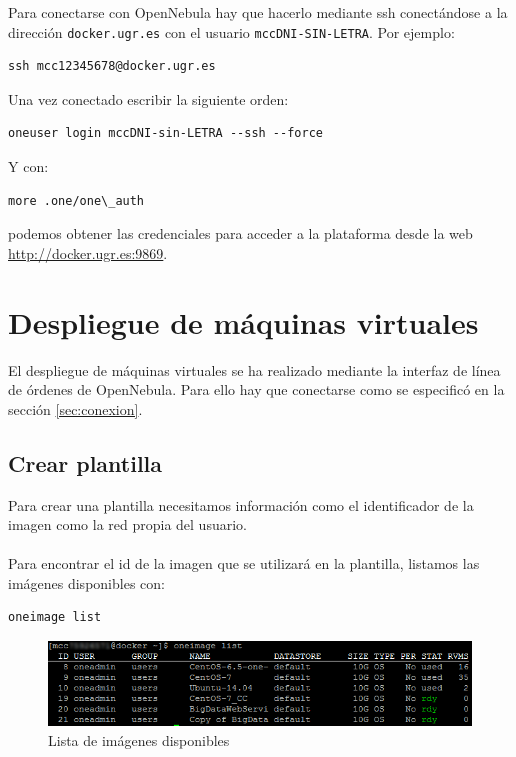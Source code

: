 Para conectarse con OpenNebula hay que hacerlo mediante ssh conectándose a la dirección \texttt{docker.ugr.es} con el usuario \texttt{mccDNI-SIN-LETRA}. Por ejemplo:

\begin{lstlisting}
ssh mcc12345678@docker.ugr.es
\end{lstlisting}

Una vez conectado escribir la siguiente orden: 

\begin{lstlisting}
oneuser login mccDNI-sin-LETRA --ssh --force
\end{lstlisting}

Y con: 

\begin{lstlisting}
more .one/one\_auth
\end{lstlisting}

podemos obtener las credenciales para acceder a la plataforma desde la web \url{http://docker.ugr.es:9869}.

\section{Despliegue de máquinas virtuales}

El despliegue de máquinas virtuales se ha realizado mediante la interfaz de línea de órdenes de OpenNebula. Para ello hay que conectarse como se especificó en la sección \ref{sec:conexion}.

\label{sec:crear-plantilla}
\subsection{Crear plantilla}

Para crear una plantilla necesitamos información como el identificador de la imagen como la red propia del usuario.
\\ \\
Para encontrar el id de la imagen que se utilizará en la plantilla, listamos las imágenes disponibles con:

\begin{lstlisting}
oneimage list
\end{lstlisting}

\begin{figure}[H]
	\centering
	\includegraphics[width=14cm]{img/oneimage-list}
	\caption{Lista de imágenes disponibles}
	\label{fig:one-image-list}
\end{figure}

